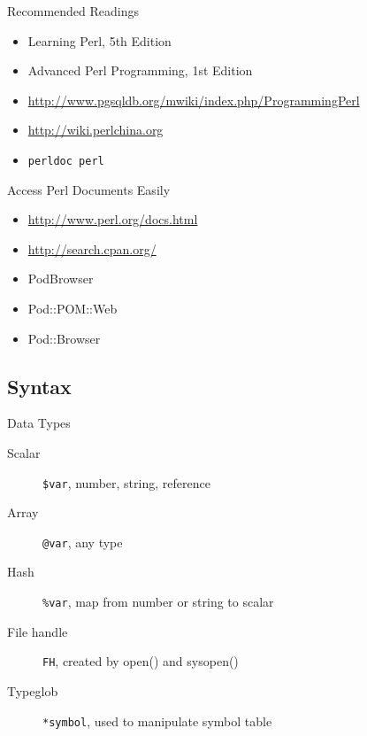 \documentclass{beamer}
\begin{document}
\begin{frame}{Recommended Readings}
  \begin{itemize}
    \item Learning Perl, 5th Edition
    \item Advanced Perl Programming, 1st Edition
    \item \url{http://www.pgsqldb.org/mwiki/index.php/ProgrammingPerl}
    \item \url{http://wiki.perlchina.org}
    \item \texttt{perldoc perl}
  \end{itemize}
\end{frame}

\begin{frame}{Access Perl Documents Easily}
  \begin{itemize}
    \item   \url{http://www.perl.org/docs.html}
    \item   \url{http://search.cpan.org/}
    \item   PodBrowser
    \item   Pod::POM::Web
    \item   Pod::Browser
  \end{itemize}
\end{frame}

\subsection{Syntax}

\begin{frame}{Data Types}
  \begin{description}
    \item[Scalar]   \texttt{\$var}, number, string, reference
    \item[Array]    \texttt{@var}, any type
    \item[Hash]     \texttt{\%var}, map from number or string to scalar
    \item[File handle] \texttt{FH}, created by open() and sysopen()
    \item[Typeglob]    \texttt{*symbol}, used to manipulate symbol table
  \end{description}
\end{frame}
\end{document}
